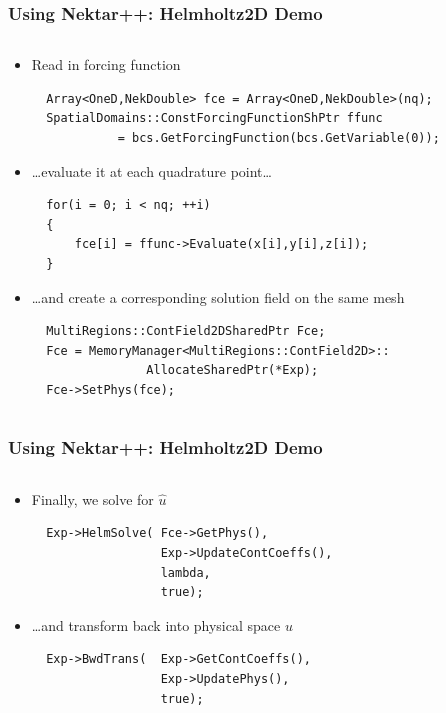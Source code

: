 \documentclass{beamer}
\numberwithin{figure}{section}
\numberwithin{equation}{section}
\begin{document}
\begin{frame}[fragile]
\frametitle{Using Nektar++: Helmholtz2D Demo}
\begin{minipage}[c][0.8\textheight][t]{\linewidth}
\begin{columns}
\begin{column}[l]{11.5cm}
\begin{itemize}
  \item Read in forcing function
  \begin{lstlisting}
  Array<OneD,NekDouble> fce = Array<OneD,NekDouble>(nq);
  SpatialDomains::ConstForcingFunctionShPtr ffunc
            = bcs.GetForcingFunction(bcs.GetVariable(0));
  \end{lstlisting}
  \item \ldots evaluate it at each quadrature point\ldots
  \begin{lstlisting}
  for(i = 0; i < nq; ++i)
  {
      fce[i] = ffunc->Evaluate(x[i],y[i],z[i]);
  }
  \end{lstlisting}
  \item \ldots and create a corresponding solution field on the same mesh
  \begin{lstlisting}
  MultiRegions::ContField2DSharedPtr Fce;
  Fce = MemoryManager<MultiRegions::ContField2D>::
                AllocateSharedPtr(*Exp);
  Fce->SetPhys(fce);
  \end{lstlisting}
\end{itemize}
\end{column}
\end{columns}
\end{minipage}
\end{frame}


\begin{frame}[fragile]
\frametitle{Using Nektar++: Helmholtz2D Demo}
\begin{minipage}[c][0.8\textheight][t]{\linewidth}
\begin{columns}
\begin{column}[l]{11.5cm}
\begin{itemize}
  \item Finally, we solve for $\hat{u}$
  \begin{lstlisting}
  Exp->HelmSolve( Fce->GetPhys(), 
                  Exp->UpdateContCoeffs(), 
                  lambda, 
                  true);
  \end{lstlisting}
  \item \ldots and transform back into physical space $u$
  \begin{lstlisting}
  Exp->BwdTrans(  Exp->GetContCoeffs(), 
                  Exp->UpdatePhys(), 
                  true);
  \end{lstlisting}
\end{itemize}
\end{column}
\end{columns}
\end{minipage}
\end{frame}
\end{document}
